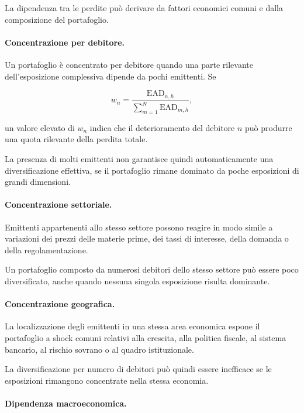 \label{subsec:cap9-concentrazione-fattori}

La dipendenza tra le perdite pu\`{o} derivare da fattori economici
comuni e dalla composizione del portafoglio.

\paragraph{Concentrazione per debitore.}

Un portafoglio \`{e} concentrato per debitore quando una parte
rilevante dell'esposizione complessiva dipende da pochi emittenti. Se

\[
w_n
=
\frac{
\mathrm{EAD}_{n,h}
}{
\displaystyle
\sum_{m=1}^{N}
\mathrm{EAD}_{m,h}
},
\]

un valore elevato di $w_n$ indica che il deterioramento del debitore
$n$ pu\`{o} produrre una quota rilevante della perdita totale.

La presenza di molti emittenti non garantisce quindi
automaticamente una diversificazione effettiva, se il portafoglio
rimane dominato da poche esposizioni di grandi dimensioni.

\paragraph{Concentrazione settoriale.}

Emittenti appartenenti allo stesso settore possono reagire in modo
simile a variazioni dei prezzi delle materie prime, dei tassi di
interesse, della domanda o della regolamentazione.

Un portafoglio composto da numerosi debitori dello stesso settore pu\`{o}
essere poco diversificato, anche quando nessuna singola esposizione
risulta dominante.

\paragraph{Concentrazione geografica.}

La localizzazione degli emittenti in una stessa area economica espone
il portafoglio a shock comuni relativi alla crescita, alla politica
fiscale, al sistema bancario, al rischio sovrano o al quadro
istituzionale.

La diversificazione per numero di debitori pu\`{o} quindi essere
inefficace se le esposizioni rimangono concentrate nella stessa
economia.

\paragraph{Dipendenza macroeconomica.}

